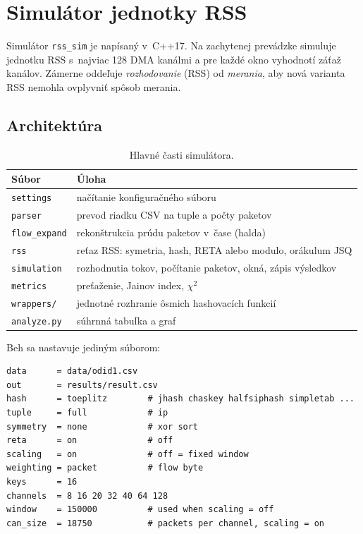 \chapter{Simulátor jednotky RSS}
\label{chap:simulator}

Simulátor \texttt{rss\_sim} je napísaný v~C++17. Na zachytenej prevádzke simuluje
jednotku RSS s~najviac 128 DMA kanálmi a pre každé okno vyhodnotí záťaž kanálov.
Zámerne oddeľuje \emph{rozhodovanie} (RSS) od \emph{merania}, aby nová varianta RSS
nemohla ovplyvniť spôsob merania.

\section{Architektúra}

\begin{table}[ht]
  \centering
  \small
  \caption{Hlavné časti simulátora.}
  \label{tab:subory}
  \begin{tabular}{l p{9.5cm}}
    \toprule
    Súbor & Úloha \\
    \midrule
    \texttt{settings}    & načítanie konfiguračného súboru \\
    \texttt{parser}      & prevod riadku CSV na tuple a počty paketov \\
    \texttt{flow\_expand} & rekonštrukcia prúdu paketov v~čase (halda) \\
    \texttt{rss}         & reťaz RSS: symetria, hash, RETA alebo modulo, orákulum JSQ \\
    \texttt{simulation}  & rozhodnutia tokov, počítanie paketov, okná, zápis výsledkov \\
    \texttt{metrics}     & preťaženie, Jainov index, $\chi^2$ \\
    \texttt{wrappers/}   & jednotné rozhranie ôsmich hashovacích funkcií \\
    \texttt{analyze.py}  & súhrnná tabuľka a graf \\
    \bottomrule
  \end{tabular}
\end{table}

Beh sa nastavuje jediným súborom:

\begin{lstlisting}
data      = data/odid1.csv
out       = results/result.csv
hash      = toeplitz        # jhash chaskey halfsiphash simpletab ...
tuple     = full            # ip
symmetry  = none            # xor sort
reta      = on              # off
scaling   = on              # off = fixed window
weighting = packet          # flow byte
keys      = 16
channels  = 8 16 20 32 40 64 128
window    = 150000          # used when scaling = off
can_size  = 18750           # packets per channel, scaling = on
\end{lstlisting}

